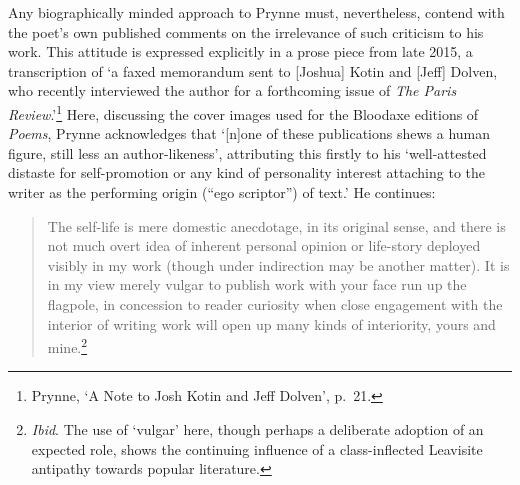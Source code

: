 \documentclass[]{article}
\begin{document}
Any biographically minded approach to Prynne must, nevertheless, contend
with the poet’s own published comments on the irrelevance of such
criticism to his work. This attitude is expressed explicitly in a prose
piece from late 2015, a transcription of ‘a faxed memorandum sent to
{[}Joshua{]} Kotin and {[}Jeff{]} Dolven, who recently interviewed the
author for a forthcoming issue of \emph{The Paris Review}.’\footnote{Prynne,
  ‘A Note to Josh Kotin and Jeff Dolven’, p.~21.} Here, discussing the
cover images used for the Bloodaxe editions of \emph{Poems}, Prynne
acknowledges that ‘{[}n{]}one of these publications shews a human
figure, still less an author-likeness’, attributing this firstly to his
‘well-attested distaste for self-promotion or any kind of personality
interest attaching to the writer as the performing origin (“ego
scriptor”) of text.’ He continues:

\begin{quote}
\singlespacing The self-life is mere domestic anecdotage, in its
original sense, and there is not much overt idea of inherent personal
opinion or life-story deployed visibly in my work (though under
indirection may be another matter). It is in my view merely vulgar to
publish work with your face run up the flagpole, in concession to reader
curiosity when close engagement with the interior of writing work will
open up many kinds of interiority, yours and mine.\footnote{\emph{Ibid}.
  The use of ‘vulgar’ here, though perhaps a deliberate adoption of an
  expected role, shows the continuing influence of a class-inflected
  Leavisite antipathy towards popular literature.}
\end{quote}
\end{document}
